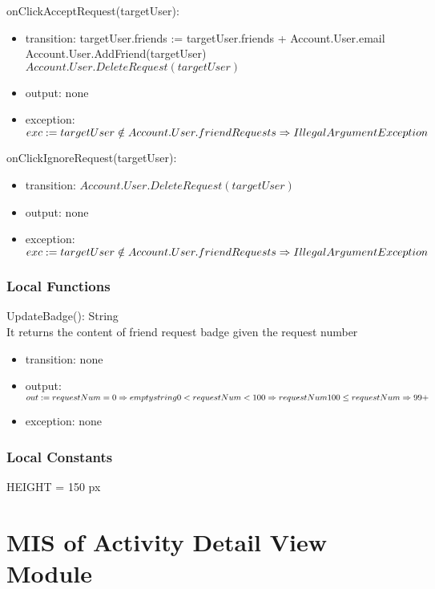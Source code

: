 \documentclass[12pt, titlepage]{article}
\begin{document}
\noindent onClickAcceptRequest(targetUser):
\begin{itemize}
\item transition: targetUser.friends := targetUser.friends + {Account.User.email}\\Account.User.AddFriend(targetUser)\\$Account.User.DeleteRequest(targetUser)$
\item output: none
\item exception: $exc := targetUser \notin Account.User.friendRequests \Rightarrow\\ IllegalArgument Exception$
\end{itemize}

\noindent onClickIgnoreRequest(targetUser):
\begin{itemize}
\item transition: $Account.User.DeleteRequest(targetUser)$
\item output: none
\item exception: $exc := targetUser \notin Account.User.friendRequests \Rightarrow\\ IllegalArgument Exception$
\end{itemize}

\subsubsection{Local Functions}

\noindent UpdateBadge(): String\\
It returns the content of friend request badge given the request number
\begin{itemize}
\item transition: none
\item output: $out := requestNum = 0 \Rightarrow empty string \\ 0 < requestNum < 100 \Rightarrow requestNum\\ 100 \leq requestNum \Rightarrow 99+$
\item exception: none
\end{itemize}

\subsubsection{Local Constants}
HEIGHT = 150 px

\newpage

\section{MIS of Activity Detail View Module} \label{mADV}
\end{document}
